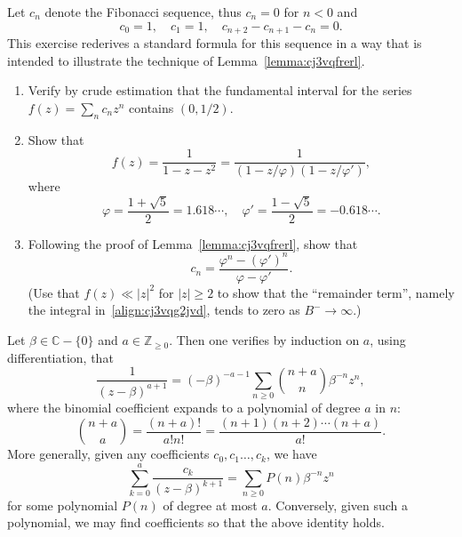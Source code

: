\documentclass[reqno]{amsart}  \numberwithin{theorem}{section} \numberwithin{equation}{section}
\begin{document}
\begin{exercise}
  Let $c_n$ denote the Fibonacci sequence, thus $c_n = 0$ for $n < 0$ and
  \begin{equation*}
    c_0 = 1, \quad c_1 = 1, \quad
    c_{n+2} - c_{n+1} - c_n = 0.
  \end{equation*}
  This exercise rederives a standard formula for this sequence in a way that is intended to illustrate the technique of Lemma~\ref{lemma:cj3vqfrerl}.
  \begin{enumerate}
  \item Verify by crude estimation that the fundamental interval for the series $f(z) = \sum_n c_n z^n$ contains $(0,1/2)$.
  \item Show that
    \begin{equation*}
      f(z) = \frac{1}{1 - z - z^2} =
      \frac{1}{(1 - z/\varphi) ( 1 - z / \varphi ')},
    \end{equation*}
    where
    \begin{equation*}
      \varphi = \frac{1 + \sqrt{5}}{2} = 1.618 \dotsb, \quad
      \varphi ' = \frac{1 - \sqrt{5}}{2} = -0.618 \dotsb.
    \end{equation*}
  \item Following the proof of Lemma~\ref{lemma:cj3vqfrerl}, show that
    \begin{equation*}
      c_n = \frac{\varphi^n - {(\varphi ')}^n }{\varphi - \varphi ' }.
    \end{equation*}
    (Use that $f(z) \ll |z|^2$ for $|z| \geq 2$ to show that the ``remainder term'', namely the integral in~\eqref{align:cj3vqg2jvd}, tends to zero as $B^- \rightarrow \infty $.)
  \end{enumerate}
\end{exercise}

\begin{example}\label{example:cj4ss5hv85}
  Let $\beta \in \mathbb{C} - \{0\}$ and $a \in \mathbb{Z}_{\geq 0}$.  Then one verifies by induction on $a$, using differentiation, that
  \begin{equation*}
    \frac{1}{(z - \beta)^{a+1}} =
    (-\beta)^{-a-1}
    \sum_{n \geq 0}
    \binom{n + a}{n} \beta^{-n} z^n,
  \end{equation*}
  where the binomial coefficient expands to a polynomial of degree $a$ in $n$:
  \begin{equation*}
    \binom{n+a}{a} = \frac{(n+a)!}{a! n!} =
    \frac{(n+1) (n+2) \dotsb (n+a)}{a!}.
  \end{equation*}
  More generally, given any coefficients $c_0, c_1\dotsc, c_k$, we have
  \begin{equation*}
    \sum_{k=0}^{a}
    \frac{c_k}{(z - \beta)^{k+1}} = \sum_{n \geq 0} P(n) \beta^{-n} z^n
  \end{equation*}
  for some polynomial $P(n)$ of degree at most $a$.  Conversely, given such a polynomial, we may find coefficients so that the above identity holds.
\end{example}
\end{document}
